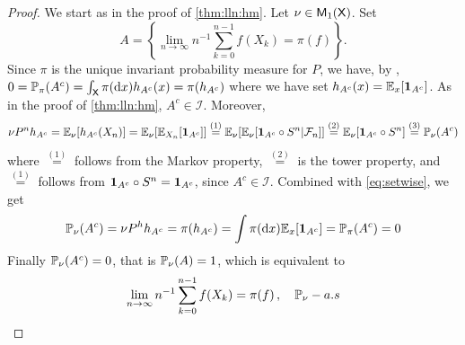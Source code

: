 \documentclass[english,graybox,envcountchap,envcountsame,sectrefs,shortlabels]{svmono}
\theoremstyle{style}
\begin{document}
\begin{proof}
We start as in the proof of \autoref{thm:lln:hm}.
Let $\nu\in\mathsf{M}_{1}(\mathsf{X})$. Set 
$$
A=\left\{ \lim_{n\to\infty}n^{-1}\sum_{k=0}^{n-1}f(X_{k})=\pi(f)\right\}.
$$
Since $\pi$ is the unique invariant
probability measure for $P$, we have, by ,
$0=\mathbb{P}_{\pi}(A^{c})=\int_{\mathsf{X}}\pi(\mathrm{d} x)h_{A^{c}}(x)=\pi(h_{A^{c}})$
where we have set $h_{A^{c}}(x)=\mathbb{E}_{x}[\mathbf{1}_{A^{c}}]$. As in the proof of \autoref{thm:lln:hm}, $A^c\in {\mathcal I}$. Moreover, $$
\nu P^n h_{A^{c}}=\mathbb{E}_\nu[h_{A^{c}}(X_n)]=\mathbb{E}_\nu[\mathbb{E}_{X_n}[\mathbf{1}_{A^{c}}]]\stackrel{(1)}{=}\mathbb{E}_\nu[\mathbb{E}_{\nu}[\mathbf{1}_{A^{c}}\circ S^n|\mathcal{F}_n]]\stackrel{(2)}{=}\mathbb{E}_{\nu}[\mathbf{1}_{A^{c}}\circ S^n]\stackrel{(3)}{=}\mathbb{P}_\nu(A^c)
$$
where $\stackrel{(1)}{=}$ follows from the Markov property, $\stackrel{(2)}{=}$ is the tower property, and $\stackrel{(1)}{=}$ follows from $\mathbf{1}_{A^{c}}\circ S^n=\mathbf{1}_{A^{c}}$, since $A^c\in {\mathcal I}$. Combined with \eqref{eq:setwise}, we get
$$
\mathbb{P}_\nu(A^c)=\nu P^h h_{A^{c}}=\pi(h_{A^c})=\int \pi(\mathrm{d} x) \mathbb{E}_x[\mathbf{1}_{A^c}]=\mathbb{P}_\pi(A^c)=0
$$
Finally $\mathbb{P}_\nu(A^c)=0$, that is $\mathbb{P}_\nu(A)=1$, which is equivalent to
$$
\lim_{n\to\infty}n^{-1}\sum_{k=0}^{n-1}f(X_{k})=\pi(f)\,,\quad\mathbb{P}_{\nu}-a.s
$$
\end{proof}

\end{document}
